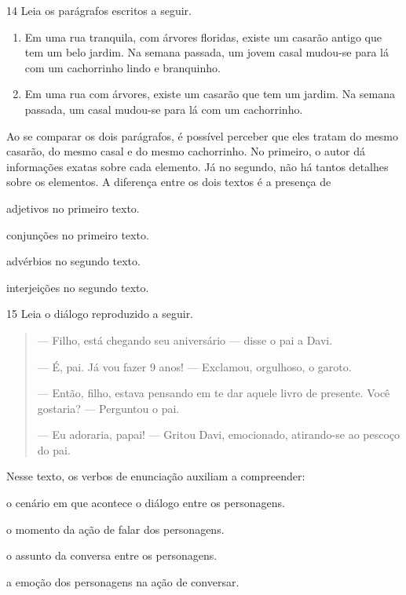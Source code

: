 \num{14} Leia os parágrafos escritos a seguir.

\begin{enumerate}
\item Em uma rua tranquila, com árvores floridas, existe um casarão antigo
que tem um belo jardim. Na semana passada, um jovem casal mudou-se para
lá com um cachorrinho lindo e branquinho.

\item Em uma rua com árvores, existe um casarão que tem um jardim. Na
semana passada, um casal mudou-se para lá com um cachorrinho.
\end{enumerate}

Ao se comparar os dois parágrafos, é possível perceber que eles tratam
do mesmo casarão, do mesmo casal e do mesmo cachorrinho. No primeiro, o
autor dá informações exatas sobre cada elemento. Já no segundo, não há
tantos detalhes sobre os elementos. A diferença entre os dois textos é a
presença de

\begin{escolha}
\item adjetivos no primeiro texto.

\item conjunções no primeiro texto.

\item advérbios no segundo texto.

\item interjeições no segundo texto.
\end{escolha}


\num{15} Leia o diálogo reproduzido a seguir.

\begin{quote}
--- Filho, está chegando seu aniversário --- disse o pai a Davi.

--- É, pai. Já vou fazer 9 anos! --- Exclamou, orgulhoso, o
garoto.

--- Então, filho, estava pensando em te dar aquele livro de
presente. Você gostaria? --- Perguntou o pai.

--- Eu adoraria, papai! --- Gritou Davi, emocionado, atirando-se
ao pescoço do pai.

\end{quote}

Nesse texto, os verbos de enunciação auxiliam a compreender:

\begin{escolha}
\item o cenário em que acontece o diálogo entre os personagens.

\item o momento da ação de falar dos personagens.

\item o assunto da conversa entre os personagens.

\item a emoção dos personagens na ação de conversar.
\end{escolha}



